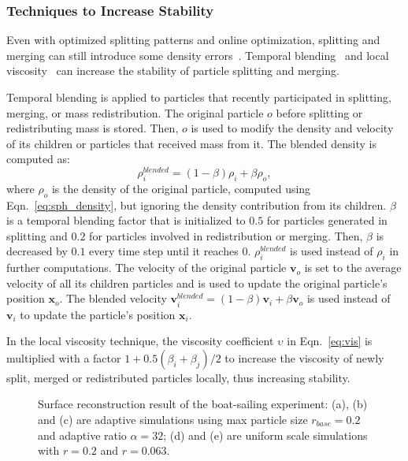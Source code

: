\documentclass[VANCOUVER,STIX1COL]{WileyNJD-v2}
\begin{document}
\subsubsection{Techniques to Increase Stability}
Even with optimized splitting patterns and online optimization, splitting and merging can still introduce some density errors~\cite{Winchenbach21}. Temporal blending~\cite{Winchenbach17} and local viscosity~\cite{Winchenbach21} can increase the stability of particle splitting and merging.

Temporal blending is applied to particles that recently participated in splitting, merging, or mass redistribution. The original particle $o$ before splitting or redistributing mass is stored. Then, $o$ is used to modify the density and velocity of its children or particles that received mass from it. The blended density is computed as:
\begin{equation}
    \rho_i^{blended} = (1 - \beta) \rho_i + \beta \rho_o,
\end{equation}
where $\rho_o$ is the density of the original particle, computed using Eqn.~\ref{eq:sph_density}, but ignoring the density contribution from its children. $\beta$ is a temporal blending factor that is initialized to $0.5$ for particles generated in splitting and $0.2$ for particles involved in redistribution or merging.  Then, $\beta$ is decreased by $0.1$ every time step until it reaches $0$. $\rho_i^{blended}$ is used instead of $\rho_i$ in further computations.
The velocity of the original particle $\mathbf{v}_o$ is set to the average velocity of all its children particles and is used to update the original particle's position $\mathbf{x}_o$. The blended velocity $\mathbf{v}_i^{blended} = (1 - \beta) \mathbf{v}_i + \beta \mathbf{v}_o$ is used instead of $\mathbf{v}_i$ to update the particle's position $\mathbf{x}_i$.

In the local viscosity technique, the viscosity coefficient $\upsilon$ in Eqn.~\ref{eq:vis} is multiplied with a factor $1 + 0.5(\beta_i + \beta_j)/2$ to increase the viscosity of newly split, merged or redistributed particles locally, thus increasing stability.

\begin{figure}
    \centering
    \caption{Surface reconstruction result of the boat-sailing experiment: (a), (b) and (c) are adaptive simulations using max particle size $r_{base} = 0.2$ and adaptive ratio $\alpha = 32$; (d) and (e) are uniform scale simulations with $r = 0.2$ and $r = 0.063$.}
    \label{fig:ship_reconstruct}
\end{figure}
\end{document}
